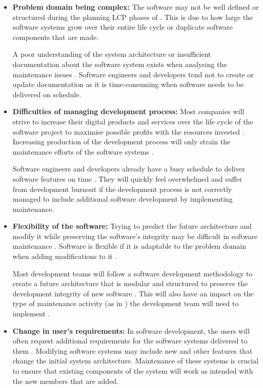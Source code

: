 \begin{itemize}
	\item \textbf{Problem domain being complex:} The software may not be well defined or structured during the planning LCP phases of . This is due to how large the software systems grow over their entire life cycle or duplicate software components that are made.\par A poor understanding of the system architecture or insufficient documentation about the software system exists when analysing the maintenance issues \cite{Galster2019}. Software engineers and developers tend not to create or update documentation as it is time-consuming when software needs to be delivered on schedule.
	\item \textbf{Difficulties of managing development process:} Most companies will strive to increase their digital products and services over the life cycle of the software project to maximise possible profits with the resources invested \cite{Niu2018}. Increasing production of the development process will only strain the maintenance efforts of the software systems \cite{Sneed2004}.\par Software engineers and developers already have a busy schedule to deliver software features on time \cite{Galster2019, Lenarduzzi2017}. They will quickly feel overwhelmed and suffer from development burnout if the development process is not correctly managed to include additional software development by implementing maintenance.
	\item \textbf{Flexibility of the software:} Trying to predict the future architecture and modify it while preserving the software's integrity may be difficult in software maintenance \cite{Garlan1999}. Software is flexible if it is adaptable to the problem domain when adding modifications to it \cite{Ogheneovo2014}.\par Most development teams will follow a software development methodology to create a future architecture that is modular and structured to preserve the development integrity of new software \cite{Vijayasarathy2016}. This will also have an impact on the type of maintenance activity (as in ) the development team will need to implement \cite{Thamburaj2017, Snipes2018}.
	\item \textbf{Change in user's requirements:} In software development, the users will often request additional requirements for the software systems delivered to them \cite{Ogheneovo2014}. Modifying software systems may include new and other features that change the initial system architecture. Maintenance of these systems is crucial to ensure that existing components of the system will work as intended with the new members that are added.

\end{itemize}
